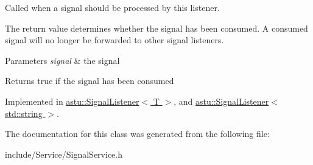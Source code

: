 Called when a signal should be processed by this listener.

The return value determines whether the signal has been consumed. A consumed signal will no longer be forwarded to other signal listeners.


\begin{DoxyParams}{Parameters}
{\em signal} & the signal \\
\hline
\end{DoxyParams}
\begin{DoxyReturn}{Returns}
{\ttfamily true} if the signal has been consumed 
\end{DoxyReturn}


Implemented in \hyperlink{classastu_1_1SignalListener_afe6b444f1413f98e6ae4982b72a43b5d}{astu\+::\+Signal\+Listener$<$ T $>$}, and \hyperlink{classastu_1_1SignalListener_afe6b444f1413f98e6ae4982b72a43b5d}{astu\+::\+Signal\+Listener$<$ std\+::string $>$}.



The documentation for this class was generated from the following file\+:\begin{DoxyCompactItemize}
\item 
include/\+Service/Signal\+Service.\+h\end{DoxyCompactItemize}
